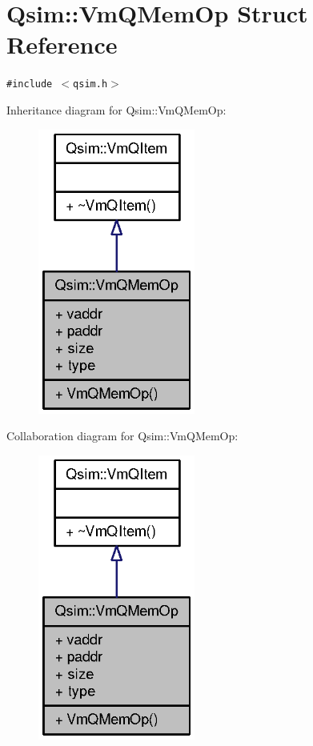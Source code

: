\section{Qsim::VmQMemOp Struct Reference}
\label{structQsim_1_1VmQMemOp}
{\tt \#include $<$qsim.h$>$}

Inheritance diagram for Qsim::VmQMemOp:\nopagebreak
\begin{figure}[H]
\begin{center}
\leavevmode
\includegraphics[width=146pt]{structQsim_1_1VmQMemOp__inherit__graph}
\end{center}
\end{figure}
Collaboration diagram for Qsim::VmQMemOp:\nopagebreak
\begin{figure}[H]
\begin{center}
\leavevmode
\includegraphics[width=146pt]{structQsim_1_1VmQMemOp__coll__graph}
\end{center}
\end{figure}
